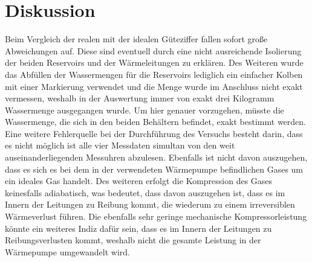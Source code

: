 \section{Diskussion}
Beim Vergleich der realen mit der idealen Güteziffer fallen sofort große Abweichungen auf. Diese sind eventuell
durch eine nicht ausreichende Isolierung der beiden Reservoirs und der Wärmeleitungen zu erklären.
Des Weiteren wurde das Abfüllen der Wassermengen für die Reservoirs lediglich ein einfacher
Kolben mit einer Markierung verwendet und die Menge wurde im Anschluss nicht exakt vermessen,
weshalb in der Auswertung immer von exakt drei Kilogramm Wassermenge ausgegangen wurde. Um hier
genauer vorzugehen, müsste die Wassermenge, die sich in den beiden Behältern befindet, exakt bestimmt werden.
Eine weitere Fehlerquelle bei der Durchführung des Versuchs besteht darin, dass es nicht möglich ist alle vier
Messdaten simultan von den weit auseinanderliegenden Messuhren abzulesen.
Ebenfalls ist nicht davon auszugehen, dass es sich es bei dem in der verwendeten Wärmepumpe befindlichen Gases um
ein ideales Gas handelt. Des weiteren erfolgt die Kompression des Gases keinesfalls adiabatisch, was bedeutet,
dass davon auszugehen ist, dass es im Innern der Leitungen zu Reibung kommt, die wiederum zu einem irreversiblen
Wärmeverlust führen. Die ebenfalls sehr geringe mechanische Kompressorleistung könnte ein weiteres Indiz dafür sein,
dass es im Innern der Leitungen zu Reibungsverlusten kommt, weshalb nicht die gesamte Leistung in der Wärmepumpe
umgewandelt wird.


\nocite{*}
\printbibliography
